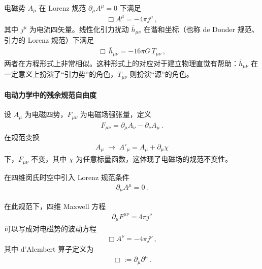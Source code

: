 \begin{derivationnote}
电磁势 $A_{\mu}$ 在 Lorenz 规范 $\partial_{\mu}A^{\mu}=0$ 下满足
\begin{align}
\Box A^{\mu}
=
-4\pi j^{\mu}\,,
\end{align}
其中 $j^{\mu}$ 为电流四矢量。线性化引力扰动 $\overline{h}_{\mu\nu}$ 在谐和坐标（也称 de Donder 规范、引力的 Lorenz 规范）下满足
\begin{align}
\Box\,\overline{h}_{\mu\nu}
=
-16\pi G\,T_{\mu\nu}\,,
\end{align}
两者在方程形式上非常相似。这种形式上的对应对于建立物理直觉有帮助：$\overline{h}_{\mu\nu}$ 在一定意义上扮演了“引力势”的角色，$T_{\mu\nu}$ 则扮演“源”的角色。
\end{derivationnote}

\paragraph{电动力学中的残余规范自由度}


\begin{definition}
设 $A_{\mu}$ 为电磁四势，$F_{\mu\nu}$ 为电磁场强张量，定义
\begin{align}
F_{\mu\nu}
=
\partial_{\mu}A_{\nu}
-
\partial_{\nu}A_{\mu}\,.
\end{align}
在规范变换
\begin{align}
A_{\mu} \;\longrightarrow\; A'_{\mu}
=
A_{\mu} + \partial_{\mu}\chi
\end{align}
下，$F_{\mu\nu}$ 不变，其中 $\chi$ 为任意标量函数，这体现了电磁场的规范不变性。

在四维闵氏时空中引入 Lorenz 规范条件
\begin{align}
\partial_{\mu}A^{\mu} = 0\,.
\end{align}
\end{definition}

在此规范下，四维 Maxwell 方程
\begin{align}
\partial_{\mu}F^{\mu\nu} = 4\pi j^{\nu}
\end{align}
可以写成对电磁势的波动方程
\begin{align}
\Box A^{\nu} = -4\pi j^{\nu}\,,
\end{align}
其中 d'Alembert 算子定义为
\begin{align}
\Box := \partial_{\mu}\partial^{\mu}\,.
\end{align}

